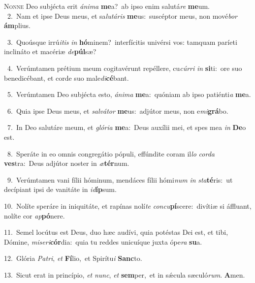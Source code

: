 \lettrine{\initial\textcolor{\initialcolor}{N}}{onne} Deo subjécta erit \textit{á}\-\textit{ni}\textit{ma} \textbf{me}\-a?~\star ab ipso enim salutá\textit{re} \textbf{me}\-um.\\
{\numbfont\textcolor{\numbcolor}{~2.}}~Nam et ipse Deus meus, et sa\-\textit{lu}\-\textit{tá}\textit{ris} \textbf{me}\-us:~\star suscéptor meus, non mové\textit{bor} \textbf{ám}\-plius.\par
{\numbfont\textcolor{\numbcolor}{~3.}}~Quoúsque irrú\-\textit{i}\-\textit{tis} \textit{in} \textbf{hó}\-minem?~\star interfícitis univérsi vos: tamquam paríeti inclináto et macériæ \textit{de}\-\textbf{púl}sæ?\par
{\numbfont\textcolor{\numbcolor}{~4.}}~Verúmtamen prétium meum cogitavérunt repéllere, cu\-\textit{cúr}\-\textit{ri} \textit{in} \textbf{si}\-ti:~\star ore suo benedicébant, et corde suo male\-\textit{di}\-\textbf{cé}bant.\par
{\numbfont\textcolor{\numbcolor}{~5.}}~Verúmtamen Deo subjécta esto, \textit{á}\-\textit{ni}\textit{ma} \textbf{me}\-a:~\star quóniam ab ipso patiénti\textit{a} \textbf{me}\-a.\par
{\numbfont\textcolor{\numbcolor}{~6.}}~Quia ipse Deus meus, et \textit{sal}\-\textit{vá}\textit{tor} \textbf{me}\-us:~\star adjútor meus, non e\-\textit{mi}\-\textbf{grá}bo.\par
{\numbfont\textcolor{\numbcolor}{~7.}}~In Deo salutáre meum, et \textit{gló}\-\textit{ri}\textit{a} \textbf{me}\-a:~\star Deus auxílii mei, et spes mea \textit{in} \textbf{De}\-o est.\par
{\numbfont\textcolor{\numbcolor}{~8.}}~Speráte in eo omnis congregátio pópuli, effúndite coram il\textit{lo} \textit{cor}\-\textit{da} \textbf{ves}\-tra:~\star Deus adjútor noster in \textit{æ}\-\textbf{tér}num.\par
{\numbfont\textcolor{\numbcolor}{~9.}}~Verúmtamen vani fílii hóminum, mendáces fílii hómi\textit{num} \textit{in} \textit{sta}\-\textbf{té}ris:~\star ut decípiant ipsi de vanitáte in \textit{id}\-\textbf{íp}sum.\par
{\numbfont\textcolor{\numbcolor}{10.}}~Nolíte speráre in iniquitáte, et rapínas nolí\textit{te} \textit{con}\-\textit{cu}\textbf{pí}scere:~\star divítiæ si áffluant, nolíte cor \textit{ap}\-\textbf{pó}nere.\par
{\numbfont\textcolor{\numbcolor}{11.}}~Semel locútus est Deus, duo hæc audívi, quia potéstas Dei est, et tibi, Dómine, \textit{mi}\-\textit{se}\textit{ri}\textbf{cór}dia:~\star quia tu reddes unicuíque juxta ópe\textit{ra} \textbf{su}\-a.\par
{\numbfont\textcolor{\numbcolor}{12.}}~Glória \textit{Pa}\-\textit{tri}, \textit{et} \textbf{Fí}\-lio,~\star et Spirítu\textit{i} \textbf{Sanc}\-to.\par
{\numbfont\textcolor{\numbcolor}{13.}}~Sicut erat in princípio, \textit{et} \textit{nunc}\-, \textit{et} \textbf{sem}\-per,~\star et in sǽcula sæculó\-\textit{rum}\-. \textbf{A}\-men.\par
